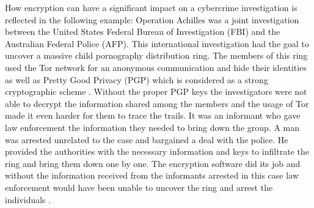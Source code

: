\documentclass[a4paper, 11pt]{article}
\begin{document}
\par How encryption can have a significant impact on a cybercrime investigation is reflected in the following example: Operation Achilles was a joint investigation between the United States Federal Bureau of Investigation (FBI) and the Australian Federal Police (AFP). This international investigation had the goal to uncover a massive child pornography distribution ring. The members of this ring used the Tor network for an anonymous communication and hide their identities as well as Pretty Good Privacy (PGP) which is considered as a strong cryptographic scheme \cite{STRONGCRYPTO}. Without the proper PGP keys the investigators were not able to decrypt the information shared among the members and the usage of Tor made it even harder for them to trace the trails. It was an informant who gave law enforcement the information they needed to bring down the group. A man was arrested unrelated to the case and bargained a deal with the police. He provided the authorities with the necessary information and keys to infiltrate the ring and bring them down one by one. The encryption software did its job and without the information received from the informants arrested in this case law enforcement would have been unable to uncover the ring and arrest the individuals \cite{ACHILLES} \cite{FBIACHILLES}.
\end{document}
